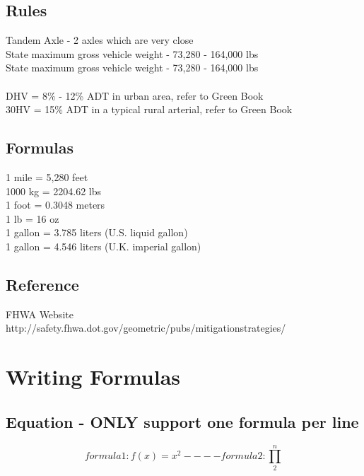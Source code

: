 \documentclass{article}
\begin{document}
  \subsection{Rules}
  Tandem Axle - 2 axles which are very close\\
  State maximum gross vehicle weight - 73,280 - 164,000 lbs\\
  State maximum gross vehicle weight - 73,280 - 164,000 lbs\\
  \\
  DHV = 8\% - 12\% ADT in urban area, refer to Green Book\\
  30HV = 15\% ADT in a typical rural arterial, refer to Green Book\\

  \subsection{Formulas}
  1 mile = 5,280 feet \\
  1000 kg = 2204.62 lbs \\
  1 foot = 0.3048 meters \\
  1 lb = 16 oz \\
  1 gallon = 3.785 liters (U.S. liquid gallon) \\
  1 gallon = 4.546 liters (U.K. imperial gallon) \\


  \subsection{Reference}
  FHWA Website \\
  http://safety.fhwa.dot.gov/geometric/pubs/mitigationstrategies/ \\

  \newpage

  \section{Writing Formulas}
  \subsection{Equation - ONLY support one formula per line}
  \begin{equation}
    formula 1: f(x) = x^2   ----
    formula 2: \prod_{2}^{n}
  \end{equation}
\end{document}
